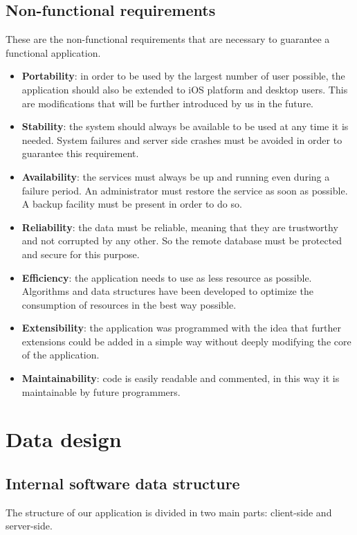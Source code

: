 \documentclass[a4paper]{scrreprt}
\begin{document}
\section{Non-functional requirements}
These are the non-functional requirements that are necessary to guarantee a functional application.
\bigskip\begin{itemize}
\item \textbf{Portability}: in order to be used by the largest number of user possible, the application should also be extended to iOS platform and desktop users. This are modifications that will be further introduced by us in the future. 
\item \textbf{Stability}: the system should always be available to be used at any time it is needed. System failures and server side crashes must be avoided in order to guarantee this requirement.
\item \textbf{Availability}: the services must always be up and running even during a failure period. An administrator must restore the service as soon as possible. A backup facility must be present in order to do so.
\item \textbf{Reliability}: the data must be reliable, meaning that they are trustworthy and not corrupted by any other. So the remote database must be protected and secure for this purpose.
\item\textbf{Efficiency}: the application needs to use as less resource as possible. Algorithms and data structures have been developed to optimize the consumption of resources in the best way possible. 
\item \textbf{Extensibility}: the application was programmed with the idea that further extensions could be added in a simple way without deeply modifying the core of the application.
\item \textbf{Maintainability}: code is easily readable and commented, in this way it is maintainable by future programmers.

\end{itemize}

\chapter{Data design}

\section{Internal software data structure}
The structure of our application is divided in two main parts: client-side and server-side.
\end{document}
